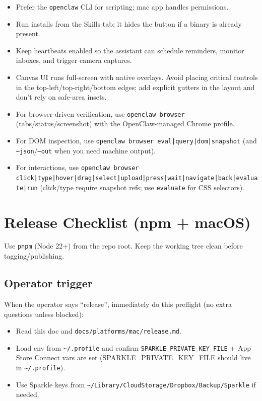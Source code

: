 \begin{itemize}
  \item Prefer the \texttt{openclaw} CLI for scripting; mac app handles permissions.
  \item Run installs from the Skills tab; it hides the button if a binary is already present.
  \item Keep heartbeats enabled so the assistant can schedule reminders, monitor inboxes, and trigger camera captures.
  \item Canvas UI runs full-screen with native overlays. Avoid placing critical controls in the top-left/top-right/bottom edges; add explicit gutters in the layout and don’t rely on safe-area insets.
  \item For browser-driven verification, use \texttt{openclaw browser} (tabs/status/screenshot) with the OpenClaw-managed Chrome profile.
  \item For DOM inspection, use \texttt{openclaw browser eval|query|dom|snapshot} (and \texttt{--json}/\texttt{--out} when you need machine output).
  \item For interactions, use \texttt{openclaw browser click|type|hover|drag|select|upload|press|wait|navigate|back|evaluate|run} (click/type require snapshot refs; use \texttt{evaluate} for CSS selectors).
\end{itemize}



\clearpage

\section{Release Checklist (npm + macOS)}


Use \texttt{pnpm} (Node 22+) from the repo root. Keep the working tree clean before tagging/publishing.

\subsection{Operator trigger}


When the operator says “release”, immediately do this preflight (no extra questions unless blocked):

\begin{itemize}
  \item Read this doc and \texttt{docs/platforms/mac/release.md}.
  \item Load env from \texttt{\textasciitilde{}/.profile} and confirm \texttt{SPARKLE\_PRIVATE\_KEY\_FILE} + App Store Connect vars are set (SPARKLE\_PRIVATE\_KEY\_FILE should live in \texttt{\textasciitilde{}/.profile}).
  \item Use Sparkle keys from \texttt{\textasciitilde{}/Library/CloudStorage/Dropbox/Backup/Sparkle} if needed.
\end{itemize}


